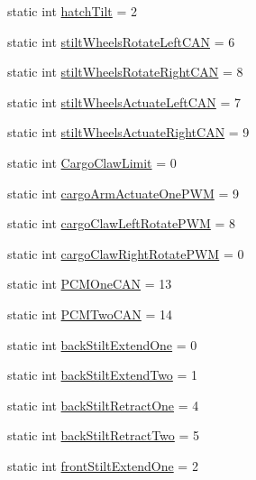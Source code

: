 \begin{DoxyCompactItemize}
\item 
static int \hyperlink{classfrc_1_1robot_1_1RobotMap_a0c656cb43ea0fd37d6b94991e8473bf9}{hatch\+Tilt} = 2
\item 
static int \hyperlink{classfrc_1_1robot_1_1RobotMap_a207ae1f0df88fd16e01e6cb1b99f5208}{stilt\+Wheels\+Rotate\+Left\+C\+AN} = 6
\item 
static int \hyperlink{classfrc_1_1robot_1_1RobotMap_ab522f4712e7ed6ca72dc978e324fdc3e}{stilt\+Wheels\+Rotate\+Right\+C\+AN} = 8
\item 
static int \hyperlink{classfrc_1_1robot_1_1RobotMap_a49ce156a9e6ef017c0c6ebfead8998ad}{stilt\+Wheels\+Actuate\+Left\+C\+AN} = 7
\item 
static int \hyperlink{classfrc_1_1robot_1_1RobotMap_a8ff2304f39bd99c3b9705aa9977f21c2}{stilt\+Wheels\+Actuate\+Right\+C\+AN} = 9
\item 
static int \hyperlink{classfrc_1_1robot_1_1RobotMap_a42ebc770489a95382644455c79dfb3c6}{Cargo\+Claw\+Limit} = 0
\item 
static int \hyperlink{classfrc_1_1robot_1_1RobotMap_aaff9d0adef8e1f97db2ac47f985f044a}{cargo\+Arm\+Actuate\+One\+P\+WM} = 9
\item 
static int \hyperlink{classfrc_1_1robot_1_1RobotMap_aa5824f279bf68bbd68ae1ea3087c4b67}{cargo\+Claw\+Left\+Rotate\+P\+WM} = 8
\item 
static int \hyperlink{classfrc_1_1robot_1_1RobotMap_a108c3b97c541e7ed5a152cea66981231}{cargo\+Claw\+Right\+Rotate\+P\+WM} = 0
\item 
static int \hyperlink{classfrc_1_1robot_1_1RobotMap_a79a848df56d706c787d9a4f9a0434e7f}{P\+C\+M\+One\+C\+AN} = 13
\item 
static int \hyperlink{classfrc_1_1robot_1_1RobotMap_a1667413e090171add7254ea3ada3a786}{P\+C\+M\+Two\+C\+AN} = 14
\item 
static int \hyperlink{classfrc_1_1robot_1_1RobotMap_a6b076d1f5509d27622dd6119d0cf87df}{back\+Stilt\+Extend\+One} = 0
\item 
static int \hyperlink{classfrc_1_1robot_1_1RobotMap_a8ca652cb3d064af4fa63e10d5f8a61ea}{back\+Stilt\+Extend\+Two} = 1
\item 
static int \hyperlink{classfrc_1_1robot_1_1RobotMap_a8747738291bc40d22cac88f94783fc94}{back\+Stilt\+Retract\+One} = 4
\item 
static int \hyperlink{classfrc_1_1robot_1_1RobotMap_a592884e36a4a4183b06712642911af62}{back\+Stilt\+Retract\+Two} = 5
\item 
static int \hyperlink{classfrc_1_1robot_1_1RobotMap_ac82bec623ae333203544bc6e2b6affca}{front\+Stilt\+Extend\+One} = 2

\end{DoxyCompactItemize}
